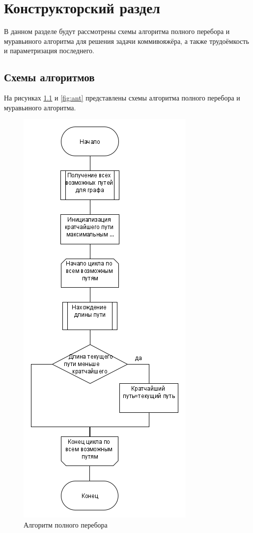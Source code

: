 \chapter{Конструкторский раздел}
\label{cha:design}
В данном разделе будут рассмотрены схемы алгоритма полного перебора и муравьиного алгоритма для решения задачи коммивояжёра, а также трудоёмкость и параметризация последнего.

\section{Схемы алгоритмов}
\label{sec:schemes}
На рисунках \ref{fig:bf} и \ref{fig:ant} представлены схемы алгоритма полного перебора и муравьиного алгоритма.
\begin{figure}[H]
	\centering
	\includegraphics[width=0.5\linewidth]{src/bf}
	\caption{Алгоритм полного перебора}
	\label{fig:bf}
\end{figure}
